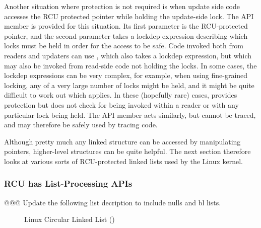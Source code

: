 Another situation where protection is not required is when update side code
accesses the RCU protected pointer while holding the update-side lock.
The  API member is provided for this
situation.
Its first parameter is the RCU-protected pointer, and the second
parameter takes a lockdep expression describing which locks must be
held in order for the access to be safe.
Code invoked both from readers and updaters can use
, which also takes a lockdep expression, but
which may also be invoked from read-side code not holding the locks.
In some cases, the lockdep expressions can be very complex, for example,
when using fine-grained locking, any of a very large number of locks
might be held, and it might be quite difficult to work out which applies.
In these (hopefully rare) cases,  provides
protection but does not check for being invoked within a reader or with
any particular lock being held.
The  API member acts similarly, but
cannot be traced, and may therefore be safely used by tracing code.

Although pretty much any linked structure can be accessed by manipulating
pointers, higher-level structures can be quite helpful.
The next section therefore looks at various sorts of RCU-protected
linked lists used by the Linux kernel.

\subsubsection{RCU has List-Processing APIs}
\label{sec:defer:RCU has List-Processing APIs}

@@@ Update the following list decription to include nulls and bl lists.

\begin{figure}[tb]
\centering
{}
\caption{Linux Circular Linked List ()}
\label{fig:defer:Linux Circular Linked List (list)}
\end{figure}

